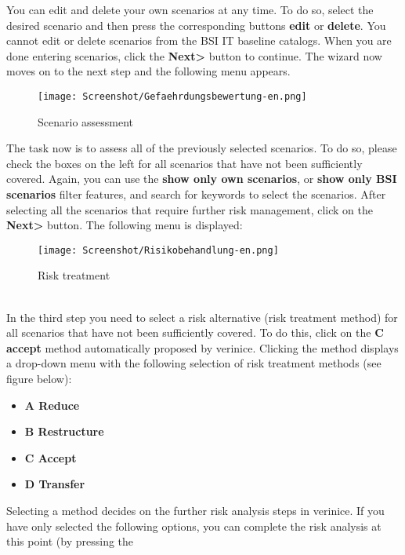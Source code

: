 \documentclass[a4paper,10pt]{book}
\begin{document}
\newline
You can edit and delete your own scenarios at any time. To do so, select
the desired scenario and then press the corresponding buttons \textbf{edit} or \textbf{delete}.
You cannot edit or delete scenarios from the BSI IT baseline catalogs. When you are done
entering scenarios, click the \textbf{Next\textgreater} button to continue. The wizard now moves
on to the next step and the following menu appears.
\newline
\begin{figure}[htb!]
  \centering
  \texttt{[image: Screenshot/Gefaehrdungsbewertung-en.png]}
  \caption{\label{Scenario assessment} Scenario assessment}
\end{figure}
\newline
The task now is to assess all of the previously selected scenarios. To do so, please check the boxes
on the left for all scenarios that have not been sufficiently covered. Again, you can use the
\textbf{show only own scenarios}, or \textbf{show only BSI scenarios} filter features, and
search for keywords to select the scenarios. After selecting all the scenarios that require
further risk management, click on the \textbf{Next\textgreater} button. The following menu is displayed:
\newline
\begin{figure}[htb!]
  \centering
  \texttt{[image: Screenshot/Risikobehandlung-en.png]}
  \caption{\label{Risk treatment} Risk treatment}
\end{figure}
\newline\\
In the third step you need to select a risk alternative (risk treatment method) for all scenarios
that have not been sufficiently covered. To do this, click on the \textbf{C accept}
method automatically proposed by verinice. Clicking the method displays a drop-down menu with
the following selection of risk treatment methods (see figure below):
\begin{itemize}
 \item{\textbf{A Reduce}}
 \item{\textbf{B Restructure}}
 \item{\textbf{C Accept}}
 \item{\textbf{D Transfer}}
\end{itemize}
Selecting a method decides on the further risk analysis steps in verinice. If you have only
selected the following options, you can complete the risk analysis at this point (by pressing the
\end{document}
